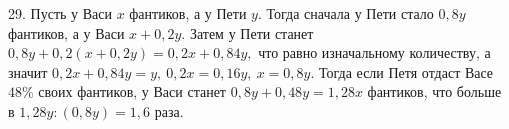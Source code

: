 29. Пусть у Васи $x$ фантиков, а у Пети $y.$ Тогда сначала у Пети стало $0,8y$ фантиков, а у Васи $x+0,2y.$ Затем у Пети станет $0,8y+0,2(x+0,2y)=0,2x+0,84y,$ что равно изначальному количеству, а значит $0,2x+0,84y=y,\ 0,2x=0,16y,\ x=0,8y.$ Тогда если Петя отдаст Васе $48\%$ своих фантиков, у Васи станет $0,8y+0,48y=1,28x$ фантиков, что больше в $1,28y:(0,8y)=1,6$ раза.\\
